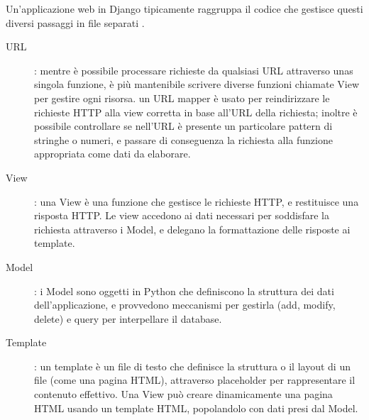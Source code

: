 \hfill\break
Un'applicazione web in Django tipicamente raggruppa il codice che gestisce questi diversi passaggi in file separati \cite{mdn-django-documentation}.
\begin{description}
    \item[URL]: mentre è possibile processare richieste da qualsiasi URL attraverso unas singola funzione, è più mantenibile scrivere diverse funzioni chiamate
    View per gestire ogni risorsa. un URL mapper è usato per reindirizzare le richieste HTTP alla view corretta in base all'URL della richiesta; inoltre è 
    possibile controllare se nell'URL è presente un particolare pattern di stringhe o numeri, e passare di conseguenza la richiesta alla funzione appropriata
    come dati da elaborare.
    \item[View]: una View è una funzione che gestisce le richieste HTTP, e restituisce una risposta HTTP. Le view accedono ai dati necessari per soddisfare la 
    richiesta attraverso i Model, e delegano la formattazione delle risposte ai template. 
    \item[Model]: i Model sono oggetti in Python che definiscono la struttura dei dati dell'applicazione, e provvedono meccanismi per gestirla (add, modify, 
    delete) e query per interpellare il database.
    \item[Template]: un template è un file di testo che definisce la struttura o il layout di un file (come una pagina HTML), attraverso placeholder per
    rappresentare il contenuto effettivo. Una View può creare dinamicamente una pagina HTML usando un template HTML, popolandolo con dati presi dal Model.
\end{description}
%

